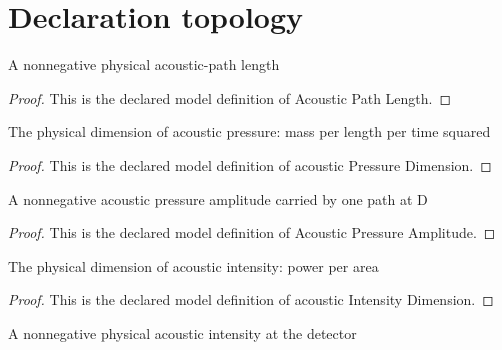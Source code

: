 \section{Declaration topology}
\begin{definition}
  \label{def:physics:phyx-mini-0325:phyxminiproblems-problemphyxmini0325-acousticpathlength}
  A nonnegative physical acoustic-path length
\end{definition}
\begin{proof}
  This is the declared model definition of Acoustic Path Length.
\end{proof}
\begin{definition}
  \label{def:physics:phyx-mini-0325:phyxminiproblems-problemphyxmini0325-acousticpressuredimension}
  The physical dimension of acoustic pressure: mass per length per time squared
\end{definition}
\begin{proof}
  This is the declared model definition of acoustic Pressure Dimension.
\end{proof}
\begin{definition}
  \label{def:physics:phyx-mini-0325:phyxminiproblems-problemphyxmini0325-acousticpressureamplitude}
  A nonnegative acoustic pressure amplitude carried by one path at D
\end{definition}
\begin{proof}
  This is the declared model definition of Acoustic Pressure Amplitude.
\end{proof}
\begin{definition}
  \label{def:physics:phyx-mini-0325:phyxminiproblems-problemphyxmini0325-acousticintensitydimension}
  The physical dimension of acoustic intensity: power per area
\end{definition}
\begin{proof}
  This is the declared model definition of acoustic Intensity Dimension.
\end{proof}
\begin{definition}
  \label{def:physics:phyx-mini-0325:phyxminiproblems-problemphyxmini0325-acousticintensity}
  A nonnegative physical acoustic intensity at the detector
\end{definition}
